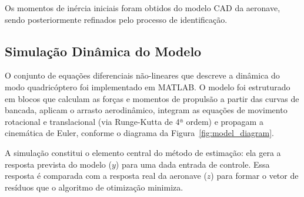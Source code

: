 \documentclass[letterpaper, 10 pt, conference]{ieeeconf}
\begin{document}
Os momentos de inércia iniciais foram obtidos do modelo CAD da aeronave, sendo posteriormente refinados pelo processo de identificação.

\subsection{Simulação Dinâmica do Modelo}

O conjunto de equações diferenciais não-lineares que descreve a dinâmica do modo quadricóptero foi implementado em MATLAB. O modelo foi estruturado em blocos que calculam as forças e momentos de propulsão a partir das curvas de bancada, aplicam o arrasto aerodinâmico, integram as equações de movimento rotacional e translacional (via Runge-Kutta de 4ª ordem) e propagam a cinemática de Euler, conforme o diagrama da Figura~\ref{fig:model_diagram}.

A simulação constitui o elemento central do método de estimação: ela gera a resposta prevista do modelo ($y$) para uma dada entrada de controle. Essa resposta é comparada com a resposta real da aeronave ($z$) para formar o vetor de resíduos que o algoritmo de otimização minimiza.
\end{document}
